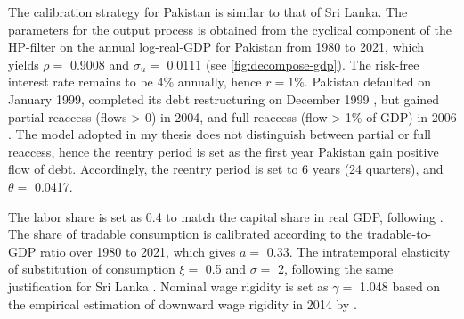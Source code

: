 The calibration strategy for Pakistan is similar to that of Sri Lanka.
The parameters for the output process is obtained from the cyclical component of the HP-filter on the annual log-real-GDP for Pakistan from 1980 to 2021, which yields $\rho = $ 0.9008 and $\sigma_u=$ 0.0111 (see \autoref{fig:decompose-gdp}).
The risk-free interest rate remains to be 4\% annually, hence $r= $1\%.
Pakistan defaulted on January 1999, completed its debt restructuring on December 1999 \citep{SPGlobal-default-report}, but gained partial reaccess (flows > 0) in 2004, and full reaccess (flow > 1\% of GDP) in 2006 \citep*[][Table 5.6]{trebesch-2011-sovereign}.
The model adopted in my thesis does not distinguish between partial or full reaccess, hence the reentry period is set as the first year Pakistan gain positive flow of debt. Accordingly, the reentry period is set to 6 years (24 quarters), and $\theta=$ 0.0417.

The labor share is set as 0.4 to match the capital share in real GDP, following \citet{Pakistan-DSGE-calibration}. The share of tradable consumption is calibrated according to the tradable-to-GDP ratio over 1980 to 2021, which gives $a=$ 0.33. The intratemporal elasticity of substitution of consumption $\xi=$ 0.5 and $\sigma=$ 2, following the same justification for Sri Lanka \citep{Pakistan-DSGE-calibration,Uribe-Schmitt-Grohe-textbook}.
Nominal wage rigidity is set as $\gamma=$ 1.048 based on the empirical estimation of downward wage rigidity in 2014 by \citet*{wage-rigidity-data}.


